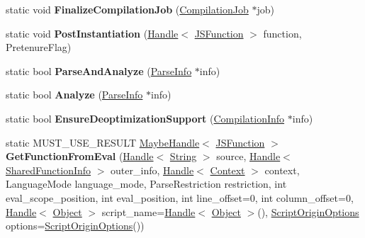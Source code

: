 \begin{DoxyCompactItemize}
\item 
static void {\bfseries Finalize\+Compilation\+Job} (\hyperlink{classv8_1_1internal_1_1_compilation_job}{Compilation\+Job} $\ast$job)\hypertarget{classv8_1_1internal_1_1_compiler_a49bdcbc0d5dd48c9a727021d4f9c1e81}{}\label{classv8_1_1internal_1_1_compiler_a49bdcbc0d5dd48c9a727021d4f9c1e81}

\item 
static void {\bfseries Post\+Instantiation} (\hyperlink{classv8_1_1internal_1_1_handle}{Handle}$<$ \hyperlink{classv8_1_1internal_1_1_j_s_function}{J\+S\+Function} $>$ function, Pretenure\+Flag)\hypertarget{classv8_1_1internal_1_1_compiler_a53477c5a6b447bb8e3b937d948f6d57a}{}\label{classv8_1_1internal_1_1_compiler_a53477c5a6b447bb8e3b937d948f6d57a}

\item 
static bool {\bfseries Parse\+And\+Analyze} (\hyperlink{classv8_1_1internal_1_1_parse_info}{Parse\+Info} $\ast$info)\hypertarget{classv8_1_1internal_1_1_compiler_aad79d5633bde4e984dfcd1fe49be584a}{}\label{classv8_1_1internal_1_1_compiler_aad79d5633bde4e984dfcd1fe49be584a}

\item 
static bool {\bfseries Analyze} (\hyperlink{classv8_1_1internal_1_1_parse_info}{Parse\+Info} $\ast$info)\hypertarget{classv8_1_1internal_1_1_compiler_aa4d9673db23ade21db25dc512da9f244}{}\label{classv8_1_1internal_1_1_compiler_aa4d9673db23ade21db25dc512da9f244}

\item 
static bool {\bfseries Ensure\+Deoptimization\+Support} (\hyperlink{classv8_1_1internal_1_1_compilation_info}{Compilation\+Info} $\ast$info)\hypertarget{classv8_1_1internal_1_1_compiler_a5e0fe838f0a3e12489d25d25a36ddeb4}{}\label{classv8_1_1internal_1_1_compiler_a5e0fe838f0a3e12489d25d25a36ddeb4}

\item 
static M\+U\+S\+T\+\_\+\+U\+S\+E\+\_\+\+R\+E\+S\+U\+LT \hyperlink{classv8_1_1internal_1_1_maybe_handle}{Maybe\+Handle}$<$ \hyperlink{classv8_1_1internal_1_1_j_s_function}{J\+S\+Function} $>$ {\bfseries Get\+Function\+From\+Eval} (\hyperlink{classv8_1_1internal_1_1_handle}{Handle}$<$ \hyperlink{classv8_1_1internal_1_1_string}{String} $>$ source, \hyperlink{classv8_1_1internal_1_1_handle}{Handle}$<$ \hyperlink{classv8_1_1internal_1_1_shared_function_info}{Shared\+Function\+Info} $>$ outer\+\_\+info, \hyperlink{classv8_1_1internal_1_1_handle}{Handle}$<$ \hyperlink{classv8_1_1internal_1_1_context}{Context} $>$ context, Language\+Mode language\+\_\+mode, Parse\+Restriction restriction, int eval\+\_\+scope\+\_\+position, int eval\+\_\+position, int line\+\_\+offset=0, int column\+\_\+offset=0, \hyperlink{classv8_1_1internal_1_1_handle}{Handle}$<$ \hyperlink{classv8_1_1internal_1_1_object}{Object} $>$ script\+\_\+name=\hyperlink{classv8_1_1internal_1_1_handle}{Handle}$<$ \hyperlink{classv8_1_1internal_1_1_object}{Object} $>$(), \hyperlink{classv8_1_1_script_origin_options}{Script\+Origin\+Options} options=\hyperlink{classv8_1_1_script_origin_options}{Script\+Origin\+Options}())\hypertarget{classv8_1_1internal_1_1_compiler_ad1e63084a6e466473b2eb2fcc953aa40}{}\label{classv8_1_1internal_1_1_compiler_ad1e63084a6e466473b2eb2fcc953aa40}


\end{DoxyCompactItemize}
